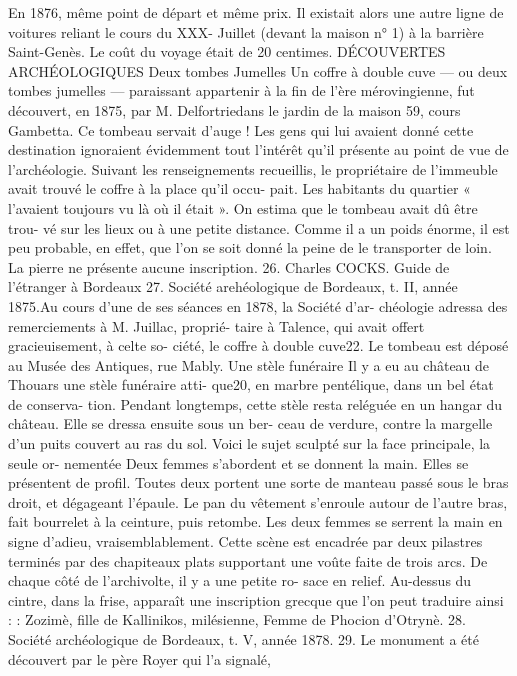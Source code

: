 \documentclass[a4paper,11pt]{book}
\begin{document}
En 1876, même point de départ et même prix. Il existait
alors une autre ligne de voitures reliant le cours du XXX-
Juillet (devant la maison n° 1) à la barrière Saint-Genès.
Le coût du voyage était de 20 centimes.
DÉCOUVERTES ARCHÉOLOGIQUES
Deux tombes Jumelles
Un coffre à double cuve — ou deux tombes jumelles —
paraissant appartenir à la fin de l'ère mérovingienne, fut
découvert, en 1875, par M. Delfortriedans le jardin de
la maison 59, cours Gambetta. Ce tombeau servait d'auge !
Les gens qui lui avaient donné cette destination ignoraient
évidemment tout l'intérêt qu'il présente au point de vue
de l'archéologie.
Suivant les renseignements recueillis, le propriétaire
de l'immeuble avait trouvé le coffre à la place qu'il occu-
pait. Les habitants du quartier « l'avaient toujours vu là
où il était ». On estima que le tombeau avait dû être trou-
vé sur les lieux ou à une petite distance. Comme il a un
poids énorme, il est peu probable, en effet, que l'on se
soit donné la peine de le transporter de loin. La pierre ne
présente aucune inscription.
26. Charles COCKS. Guide de l'étranger à Bordeaux
27. Société arehéologique de Bordeaux, t. II, année 1875.Au cours d'une de ses séances en 1878, la Société d'ar-
chéologie adressa des remerciements à M. Juillac, proprié-
taire à Talence, qui avait offert gracieuisement, à celte so-
ciété, le coffre à double cuve22.
Le tombeau est déposé au Musée des Antiques, rue
Mably.
Une stèle funéraire
Il y a eu au château de Thouars une stèle funéraire atti-
que20, en marbre pentélique, dans un bel état de conserva-
tion. Pendant longtemps, cette stèle resta reléguée en un
hangar du château. Elle se dressa ensuite sous un ber-
ceau de verdure, contre la margelle d'un puits couvert au
ras du sol.
Voici le sujet sculpté sur la face principale, la seule or-
nementée
Deux femmes s'abordent et se donnent la main. Elles
se présentent de profil. Toutes deux portent une sorte
de manteau passé sous le bras droit, et dégageant l'épaule.
Le pan du vêtement s'enroule autour de l'autre bras, fait
bourrelet à la ceinture, puis retombe.
Les deux femmes se serrent la main en signe d'adieu,
vraisemblablement.
Cette scène est encadrée par deux pilastres terminés par
des chapiteaux plats supportant une voûte faite de trois
arcs. De chaque côté de l'archivolte, il y a une petite ro-
sace en relief.
Au-dessus du cintre, dans la frise, apparaît une inscription
grecque que l'on peut traduire ainsi :
:
Zozimè, fille de Kallinikos, milésienne,
Femme de Phocion d'Otrynè.
28. Société archéologique de Bordeaux, t. V, année 1878.
29. Le monument a été découvert par le père Royer qui l'a signalé,
\end{document}
